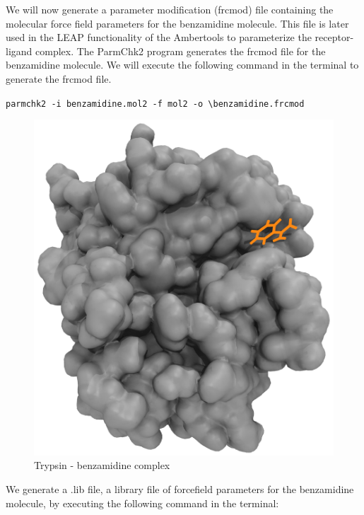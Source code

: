\documentclass[9pt,training,pubversion]{livecoms}
\begin{document}
\noindent We will now generate a parameter modification (frcmod) file containing the molecular force field parameters for the benzamidine molecule. This file is later used in the LEAP functionality of the Ambertools to parameterize the receptor-ligand complex. The ParmChk2 program generates the frcmod file for the benzamidine molecule. We will execute the following command in the terminal to generate the frcmod file. 

\begin{tcolorbox}[colback=black!8!white, colframe=black!50!black, fontlower=\tiny, left=2pt, right=2pt, top=2pt, bottom=2pt]  
\texttt{parmchk2 -i benzamidine.mol2 -f mol2 -o \textbackslash \linebreak benzamidine.frcmod}
\end{tcolorbox}

\begin{figure}[H]
\centering
\includegraphics[scale=0.12]{images/figure6.png} 
\caption{Trypsin - benzamidine complex}
\label{figure6}
\end{figure} 

\noindent We generate a .lib file, a library file of forcefield parameters for the benzamidine molecule, by executing the following command in the terminal:
\end{document}

